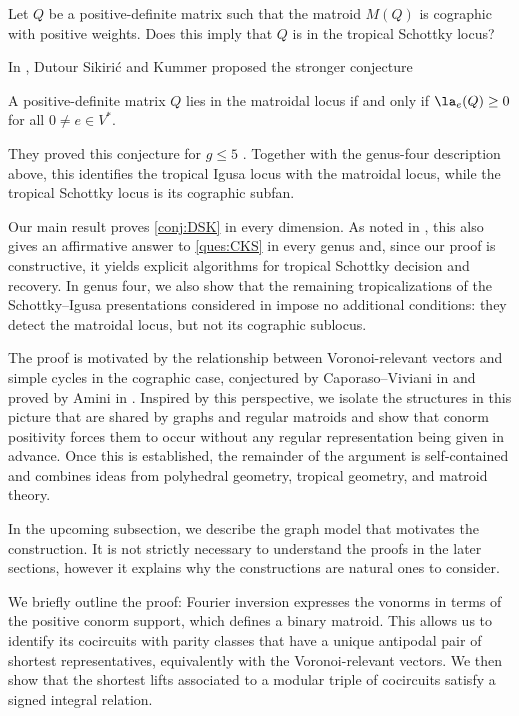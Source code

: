 \documentclass[11pt,letterpaper]{amsart}
\begin{document}
 \begin{question}\cite[Question 4.11]{chua2019schottky}\label{ques:CKS}
     Let $Q$ be a positive-definite matrix such that the matroid $M(Q)$ is cographic with positive weights. Does this imply that $Q$ is in the tropical Schottky locus?
 \end{question}
 
In \cite{sikiric2022iso}, Dutour Sikiri\'c and Kummer proposed the stronger conjecture 
\begin{conj}\cite[Conjecture 2]{sikiric2022iso}\label{conj:DSK}
    A positive-definite matrix $Q$ lies in the matroidal locus if and only if $\la_e(Q) \geq 0$ for all $0 \neq e \in V^*$.
\end{conj}
They proved this conjecture for $g\leq5$
\cite[Theorems~6.4--6.5]{sikiric2022iso}. Together with the genus-four description above, this identifies the tropical Igusa locus with the matroidal locus, while the tropical Schottky locus is its cographic subfan.

Our main result proves \cref{conj:DSK} in every dimension. As noted in \cite{sikiric2022iso}, this also gives an affirmative answer to \cref{ques:CKS} in every genus and, since our proof is constructive, it yields explicit algorithms for tropical Schottky decision and recovery. In genus four, we also show that the remaining tropicalizations of the Schottky--Igusa presentations considered in \cite{chua2019schottky} impose no additional conditions: they detect the matroidal locus, but not its cographic sublocus.

The proof is motivated by the relationship between Voronoi-relevant vectors and simple cycles in the cographic case, conjectured by Caporaso–Viviani in \cite{caporaso2010torelli} and proved by Amini in \cite{amini2010lattice}. Inspired by this perspective, we isolate the structures in this picture that are shared by graphs and regular matroids and show that conorm positivity forces them to occur without any regular representation being given in advance. Once this is established, the remainder of the argument is self-contained and combines ideas from polyhedral geometry, tropical geometry, and matroid theory. 

In the upcoming subsection, we describe the graph model that motivates the construction. It is not strictly necessary to understand the proofs in the later sections, however it explains why the constructions are natural ones to consider. 

We briefly outline the proof: Fourier inversion expresses the vonorms in terms of the positive conorm support, which defines a binary matroid. This allows us to identify its cocircuits with parity classes that have a unique antipodal pair of shortest representatives, equivalently with the Voronoi-relevant vectors. We then show that the shortest lifts associated to a modular triple of cocircuits
satisfy a signed integral relation.
\end{document}
